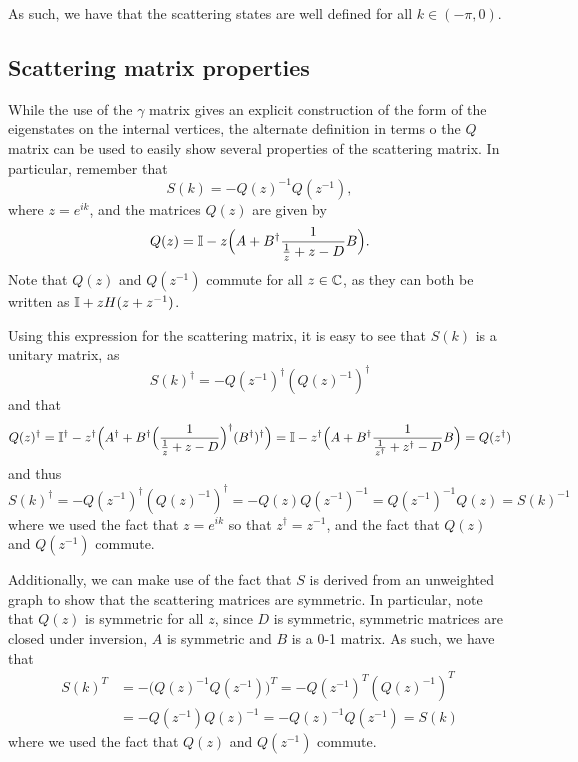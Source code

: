 \documentclass[../thesis-main/thesis-main]{subfiles}
\begin{document}
As such, we have that the scattering states are well defined for all $k\in (-\pi,0)$.  


\subsection{Scattering matrix properties}

While the use of the $\gamma$ matrix gives an explicit construction of the form of the eigenstates on the internal vertices, the alternate definition in terms o the $Q$ matrix can be used to easily show several properties of the scattering matrix.  In particular, remember that
\begin{equation}
  S(k) = - Q(z)^{-1} Q(z^{-1}),
\end{equation}
where $z=e^{i k}$, and the matrices $Q(z)$ are given by
\begin{equation}
  Q(z) = \mathbb{I} - z \Big( A + B^\dag \frac{1}{ \frac{1}{z} + z - D} B\Big).
\end{equation}
Note that $Q(z)$ and $Q(z^{-1})$ commute for all $z\in \mathbb{C}$, as they can both be written as $\mathbb{I} + z H(z + z^{-1})$.

Using this expression for the scattering matrix, it is easy to see that $S(k)$ is a unitary matrix, as 
\begin{equation}
  S(k)^{\dag} = - Q(z^{-1})^\dag (Q(z)^{-1})^\dag
\end{equation}
and that
\begin{equation}
  Q(z)^\dag = \mathbb{I}^\dag - z^\dag\Big( A^\dag + B^\dag \Big(\frac{1}{\frac{1}{z} + z - D}\Big)^\dag (B^\dag)^\dag\Big) 
     = \mathbb{I} - z^\dag \Big(A + B^\dag \frac{1}{\frac{1}{z^\dag} + z^\dag - D} B \Big) = Q(z^\dag)
\end{equation}
and thus
\begin{equation}
  S(k)^\dag = -Q(z^{-1})^\dag (Q(z)^{-1})^\dag = - Q(z) Q(z^{-1})^{-1} = Q(z^{-1})^{-1} Q(z) = S(k)^{-1}
\end{equation}
where we used the fact that $z=e^{ik}$ so that $z^\dag = z^{-1}$, and the fact that $Q(z)$ and $Q(z^{-1})$ commute.

Additionally, we can make use of the fact that $S$ is derived from an unweighted graph to show that the scattering matrices are symmetric.  In particular, note that $Q(z)$ is symmetric for all $z$, since $D$ is symmetric, symmetric matrices are closed under inversion, $A$ is symmetric and $B$ is a 0-1 matrix.  As such, we have that
\begin{align}
  S(k)^T &= -\big( Q(z)^{-1} Q(z^{-1})\big)^T = -Q(z^{-1})^T (Q(z)^{-1})^T \\
    &= -Q(z^{-1}) Q(z)^{-1} = -Q(z)^{-1} Q(z^{-1}) = S(k)
\end{align}
where we used the fact that $Q(z)$ and $Q(z^{-1})$ commute.
\end{document}
